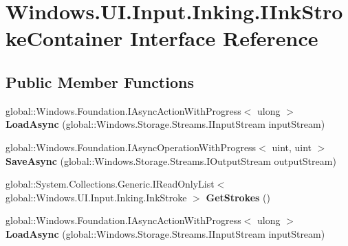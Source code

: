 \hypertarget{interface_windows_1_1_u_i_1_1_input_1_1_inking_1_1_i_ink_stroke_container}{}\section{Windows.\+U\+I.\+Input.\+Inking.\+I\+Ink\+Stroke\+Container Interface Reference}
\label{interface_windows_1_1_u_i_1_1_input_1_1_inking_1_1_i_ink_stroke_container}
\subsection*{Public Member Functions}
\begin{DoxyCompactItemize}
\item 
\mbox{\label{interface_windows_1_1_u_i_1_1_input_1_1_inking_1_1_i_ink_stroke_container_a9d69a26a67513752e224a312eed08d6a}} 
global\+::\+Windows.\+Foundation.\+I\+Async\+Action\+With\+Progress$<$ ulong $>$ {\bfseries Load\+Async} (global\+::\+Windows.\+Storage.\+Streams.\+I\+Input\+Stream input\+Stream)
\item 
\mbox{\label{interface_windows_1_1_u_i_1_1_input_1_1_inking_1_1_i_ink_stroke_container_a3b12ede6927ca0d6c499746700400fcf}} 
global\+::\+Windows.\+Foundation.\+I\+Async\+Operation\+With\+Progress$<$ uint, uint $>$ {\bfseries Save\+Async} (global\+::\+Windows.\+Storage.\+Streams.\+I\+Output\+Stream output\+Stream)
\item 
\mbox{\label{interface_windows_1_1_u_i_1_1_input_1_1_inking_1_1_i_ink_stroke_container_a71ca3cf2eb98b4245542df72cce510fb}} 
global\+::\+System.\+Collections.\+Generic.\+I\+Read\+Only\+List$<$ global\+::\+Windows.\+U\+I.\+Input.\+Inking.\+Ink\+Stroke $>$ {\bfseries Get\+Strokes} ()
\item 
\mbox{\label{interface_windows_1_1_u_i_1_1_input_1_1_inking_1_1_i_ink_stroke_container_a9d69a26a67513752e224a312eed08d6a}} 
global\+::\+Windows.\+Foundation.\+I\+Async\+Action\+With\+Progress$<$ ulong $>$ {\bfseries Load\+Async} (global\+::\+Windows.\+Storage.\+Streams.\+I\+Input\+Stream input\+Stream)

\end{DoxyCompactItemize}
